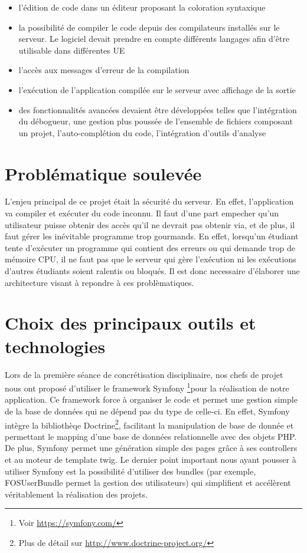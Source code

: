 \begin{itemize}

	\item l'édition de code dans un éditeur proposant la coloration syntaxique
	\item la possibilité de compiler le code depuis des compilateurs installés sur le serveur. Le logiciel devait prendre en compte différents langages afin d’être utilisable dans différentes UE
	\item l'accès aux messages d'erreur de la compilation
	\item l'exécution de l'application compilée sur le serveur avec affichage de la sortie
	\item des fonctionnalités avancées devaient être développées telles que l’intégration du débogueur, une gestion plus poussée de l’ensemble de fichiers composant un projet, l'auto-complétion du code, l'intégration d’outils d’analyse

\end{itemize}


\section{Problématique soulevée}

\par L'enjeu principal de ce projet était la sécurité du serveur. En effet, l'application va compiler et exécuter du code inconnu. Il faut d'une part empecher qu'un utilisateur puisse obtenir des accès qu'il ne devrait pas obtenir via, et de plus, il faut gérer les inévitable programme trop gourmands.  En effet, lorsqu'un étudiant tente d'exécuter un programme qui contient des erreurs ou qui demande trop de mémoire CPU, il ne faut pas que le serveur qui gère l'exécution ni les exécutions d'autres étudiants soient ralentis ou bloqués. Il est donc necessaire d'élaborer une architecture visant à repondre à ces problèmatiques.


\section{Choix des principaux outils et technologies}
\label{sec-principaux-outils}
\par Lors de la première séance de concrétisation disciplinaire, nos chefs de projet nous ont proposé d'utiliser le framework Symfony \footnote{Voir \url{https://symfony.com/}}pour la réalisation de notre application. Ce framework force à organiser le code et permet une gestion simple de la base de données qui ne dépend pas du type de celle-ci. En effet, Symfony intègre la bibliothèqe Doctrine\footnote{Plus de détail sur \url{http://www.doctrine-project.org/}}, facilitant la manipulation de base de donnée et permettant le mapping d'une base de données relationnelle avec des objets PHP. De plus, Symfony permet une génération simple des pages grâce à ses controllers et au moteur de template twig. Le dernier point important nous ayant pousser à utiliser Symfony est la possibilité d'utiliser des bundles (par exemple, FOSUserBundle permet la gestion des utilisateurs) qui simplifient et accélèrent véritablement la réalisation des projets.

